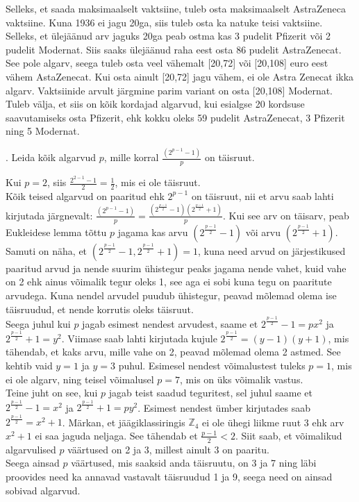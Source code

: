 \documentclass[a4paper, 10pt]{article}
\newcommand{\Z}{\mathbb{Z}}
\begin{document}
\bigskip
Selleks, et saada maksimaalselt vaktsiine, tuleb osta maksimaalselt AstraZeneca vaktsiine. Kuna 1936 ei jagu 20ga, siis tuleb osta ka natuke teisi vaktsiine. Selleks, et ülejäänud arv jaguks 20ga peab ostma kas 3 pudelit Pfizerit või 2 pudelit Modernat. Siis saaks ülejäänud raha eest osta 86 pudelit AstraZenecat. See pole algarv, seega tuleb osta veel vähemalt [20,72] või [20,108] euro eest vähem AstaZenecat. Kui osta ainult [20,72] jagu vähem, ei ole Astra Zenecat ikka algarv. Vaktsiinide arvult järgmine parim variant on osta [20,108] Modernat. Tuleb välja, et siis on kõik kordajad algarvud, kui esialgse 20 kordsuse saavutamiseks osta Pfizerit, ehk kokku oleks 59 pudelit AstraZenecat, 3 Pfizerit ning 5 Modernat. 
\bigskip
\pagebreak

. Leida kõik algarvud $p$, mille korral $\frac{(2^{p-1}-1)}{p}$ on täisruut.

\bigskip
Kui $p=2$, siis $\frac{2^{2-1}-1}{2}=\frac12$, mis ei ole täisruut.\\
Kõik teised algarvud on paaritud ehk $2^{p-1}$ on täisruut, nii et arvu saab lahti kirjutada järgnevalt: $\frac{(2^{p-1}-1)}{p}=\frac{(2^{\frac{p-1}2}-1)(2^{\frac{p-1}2}+1)}{p}$. Kui see arv on täisarv, peab Eukleidese lemma tõttu $p$ jagama kas arvu $(2^{\frac{p-1}2}-1)$ või arvu $(2^{\frac{p-1}2}+1)$. Samuti on näha, et $(2^{\frac{p-1}2}-1,2^{\frac{p-1}2}+1)=1$, kuna need arvud on järjestikused paaritud arvud ja nende suurim ühistegur peaks jagama nende vahet, kuid vahe on 2 ehk ainus võimalik tegur oleks 1, see aga ei sobi kuna tegu on paaritute arvudega. Kuna nendel arvudel puudub ühistegur, peavad mõlemad olema ise täisruudud, et nende korrutis oleks täisruut.\\
Seega juhul kui $p$ jagab esimest nendest arvudest, saame et $2^{\frac{p-1}2}-1=px^2$ ja $2^{\frac{p-1}2}+1=y^2$. Viimase saab lahti kirjutada kujule $2^{\frac{p-1}2}=(y-1)(y+1)$, mis tähendab, et kaks arvu, mille vahe on 2, peavad mõlemad olema 2 astmed. See kehtib vaid $y=1$ ja $y=3$ puhul. Esimesel nendest võimalustest tuleks $p=1$, mis ei ole algarv, ning teisel võimalusel $p=7$, mis on üks võimalik vastus.\\
Teine juht on see, kui $p$ jagab teist saadud teguritest, sel juhul saame et $2^{\frac{p-1}2}-1=x^2$ ja $2^{\frac{p-1}2}+1=py^2$. Esimest nendest ümber kirjutades saab $2^{\frac{p-1}2}=x^2+1$. Märkan, et jäägiklassiringis $\Z_4$ ei ole ühegi liikme ruut 3 ehk arv $x^2+1$ ei saa jaguda neljaga. See tähendab et $\frac{p-1}2<2$. Siit saab, et võimalikud algarvulised $p$ väärtused on 2 ja 3, millest ainult 3 on paaritu.\\
Seega ainsad $p$ väärtused, mis saaksid anda täisruutu, on 3 ja 7 ning läbi proovides need ka annavad vastavalt täisruudud 1 ja 9, seega need on ainsad sobivad algarvud.
\bigskip
\end{document}
